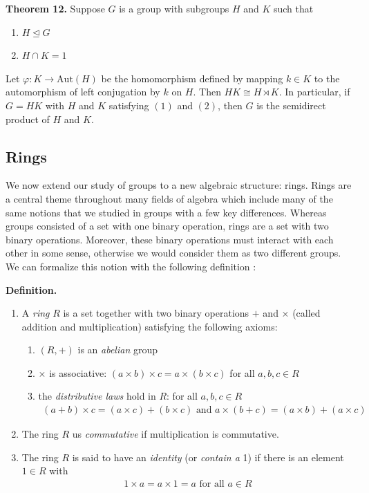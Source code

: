 \documentclass[11pt, reqno]{amsart}
\theoremstyle{plain}
\theoremstyle{definition}
\theoremstyle{example}
\def\normeq{\unlhd}
\begin{document}
\par
\textbf{Theorem 12.} Suppose $G$ is a group with subgroups $H$ and $K$ such that
\begin{enumerate}
\item $H \normeq G$
\item $H \cap K = 1$
\end{enumerate}

Let $\varphi: K \to \text{Aut}(H)$ be the homomorphism defined by mapping $k \in K$ to the automorphism of left conjugation by $k$ on $H$. Then $HK \cong H \rtimes K$. In particular, if $G = HK$ with $H$ and $K$ satisfying $(1)$ and $(2)$, then $G$ is the semidirect product of $H$ and $K$.

\subsection{Rings}

We now extend our study of groups to a new algebraic structure: rings. Rings are a central theme throughout many fields of algebra which include many of the same notions that we studied in groups with a few key differences. Whereas groups consisted of a set with one binary operation, rings are a set with two binary operations. Moreover, these binary operations must interact with each other in some sense, otherwise we would consider them as two different groups. We can formalize this notion with the following definition \cite[\S 7.1, p. 223]{dummit}:

\par
\textbf{Definition.}
\begin{enumerate}
\item A \textit{ring} $R$ is a set together with two binary operations $+$ and $\times$ (called addition and multiplication) satisfying the following axioms:
\begin{enumerate}[label=(\roman*)]

\item $(R, +)$ is an \textit{abelian} group

\item $\times$ is associative: $(a \times b) \times c = a \times (b \times c)$ for all $a, b, c \in R$

\item the \textit{distributive laws} hold in $R$: for all $a, b, c \in R$
\begin{align*}
(a + b) \times c = (a \times c) + (b \times c) \text{  and  } a \times (b + c) = (a \times b) + (a \times c)
\end{align*}
\end{enumerate}

\item The ring $R$ us \textit{commutative} if multiplication is commutative.

\item The ring $R$ is said to have an \textit{identity} (or \textit{contain a} 1) if there is an element $1 \in R$ with
\begin{align*}
1 \times a = a \times 1 = a \text{  for all } a \in R
\end{align*}
\end{enumerate}
\end{document}
